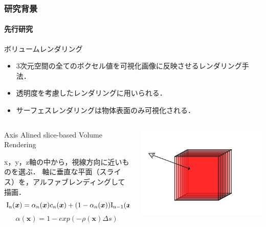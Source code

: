 \documentclass[aspectratio=169,dvipdfmx,hyperref={bookmarks=true}]{beamer}
\begin{document}
\begin{frame}
 \frametitle{研究背景}
    \framesubtitle{先行研究}
   \begin{block}{ボリュームレンダリング}
   \begin{itemize}
 	\item 3次元空間の全てのボクセル値を可視化画像に反映させるレンダリング手法．
	\item 透明度を考慮したレンダリングに用いられる．
	\item サーフェスレンダリングは物体表面のみ可視化される．
\end{itemize}
\end{block}
\begin{columns}[T]
	\begin{column}{0.6\linewidth}
	\begin{algorithm}[H]
    		\caption{Axis Alined slice-based Volume Rendering}
       	 \label{alg1}
        		\begin{algorithmic}[1]
                        \STATE x，y，z軸の中から，視線方向に近いものを選ぶ．
                        \STATE 軸に垂直な平面（スライス）を，アルファブレンディングして描画．
                        \[{\rm{I_n}}(\bm{x})= \alpha_n(\bm{x})c_n(\bm{x}) + (1-\alpha_n(\bm{x})){\rm{I_{n-1}}}(\bm{x})\]
                        \[\alpha(\bm{x}) = 1 - exp(-\rho(\bm{x})\Delta s)\]
            	\end{algorithmic}
	\end{algorithm}
    	\end{column}
	
	\begin{column}{0.4\linewidth}
	\includegraphics[width=\linewidth]{images/slice_base.png}
    	\end{column}
    \end{columns}
 \end{frame}
\end{document}
